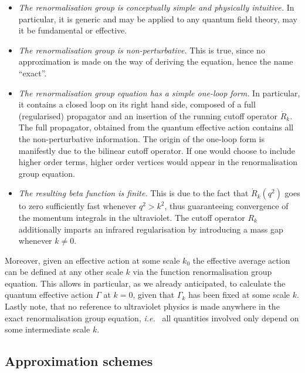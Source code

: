 \documentclass[11pt]{book}
\newcommand\ie{\textit{i.e.}\ }
\numberwithin{equation}{chapter}
\begin{document}
\begin{itemize}
  \setlength\itemsep{1.2mm}
  \item
    \textit{The renormalisation group is conceptually simple and physically intuitive.}
    In particular, it is generic and may be applied to any quantum field theory,
    may it be fundamental or effective.
  \item
    \textit{The renormalisation group is non-perturbative.}
    This is true, since no approximation is made on the way of deriving the
    equation, hence the name ``exact''.
  \item
    \textit{The renormalisation group equation has a simple one-loop form.}
    In particular, it contains a closed loop on its right hand side,
    composed of a full (regularised)  propagator and an insertion
    of the running cutoff operator $\dot R_k$.
    The full propagator, obtained from the quantum effective action contains
    all the non-perturbative information.
    The origin of the one-loop form is manifestly due to the bilinear
    cutoff operator. If one would choose to include higher order terms,
    higher order vertices would appear in the renormalisation group equation.
  \item
    \textit{The resulting beta function is finite.}
    This is due to the fact that $\dot R_k(q^2)$ goes to zero
    sufficiently fast whenever $q^2 > k^2$, thus guaranteeing convergence
    of the momentum integrals in the ultraviolet. The cutoff operator
    $R_k$ additionally imparts an infrared regularisation
    by introducing a mass gap whenever $k \neq 0$.
\end{itemize}
\bigskip
Moreover, given an effective action at some scale $k_0$ the
effective average action can be defined at any other scale $k$
via the function renormalisation group equation. This allows
in particular, as we already anticipated, to calculate the
quantum effective action $\Gamma$ at $k=0$, given that
$\Gamma_k$ has been fixed at some scale $k$.
Lastly note, that no reference to ultraviolet physics is made
anywhere in the exact renormalisation group equation, \ie
all quantities involved only depend on some intermediate scale $k$.


\subsection{Approximation schemes}
\label{sec:approxschemes}
\end{document}
